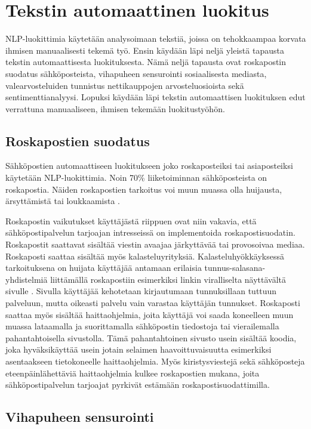 \chapter{Tekstin automaattinen luokitus\label{methods}}

NLP-luokittimia käytetään analysoimaan tekstiä, joissa on tehokkaampaa korvata ihmisen manuaalisesti tekemä työ. Ensin käydään läpi neljä yleistä tapausta tekstin automaattisesta luokituksesta. Nämä neljä tapausta ovat roskapostin suodatus sähköposteista, vihapuheen sensurointi sosiaalisesta mediasta, valearvosteluiden tunnistus nettikauppojen arvosteluosioista sekä sentimenttianalyysi. Lopuksi käydään läpi tekstin automaattisen luokituksen edut verrattuna manuaaliseen, ihmisen tekemään luokitustyöhön.

\section{Roskapostien suodatus}

Sähköpostien automaattiseen luokitukseen joko roskaposteiksi tai asiaposteiksi käytetään NLP-luokittimia. Noin 70\% liiketoiminnan sähköposteista on roskapostia. Näiden roskapostien tarkoitus voi muun muassa olla huijausta, ärsyttämistä tai loukkaamista \citep{spam}.

Roskapostin vaikutukset käyttäjästä riippuen ovat niin vakavia, että sähköpostipalvelun tarjoajan intresseissä on implementoida roskapostisuodatin. Roskapostit saattavat sisältää viestin avaajaa järkyttävää tai provosoivaa mediaa. Roskaposti saattaa sisältää myös kalasteluyrityksiä. Kalasteluhyökkäyksessä tarkoituksena on huijata käyttäjää antamaan erilaisia tunnus-salasana-yhdistelmiä liittämällä roskapostiin esimerkiksi linkin viralliselta näyttävältä sivulle \citep{phishing}. Sivulla käyttäjää kehotetaan kirjautumaan tunnuksillaan tuttuun palveluun, mutta oikeasti palvelu vain varastaa käyttäjän tunnukset. Roskaposti saattaa myös sisältää haittaohjelmia, joita käyttäjä voi saada koneelleen muun muassa lataamalla ja suorittamalla sähköpostin tiedostoja tai vierailemalla pahantahtoisella sivustolla. Tämä pahantahtoinen sivusto usein sisältää koodia, joka hyväksikäyttää usein jotain selaimen haavoittuvaisuutta esimerkiksi asentaakseen tietokoneelle haittaohjelmia. Myös kiristysviestejä sekä sähköposteja eteenpäinlähettäviä haittaohjelmia kulkee roskapostien mukana, joita sähköpostipalvelun tarjoajat pyrkivät estämään roskapostisuodattimilla.

\section{Vihapuheen sensurointi}

